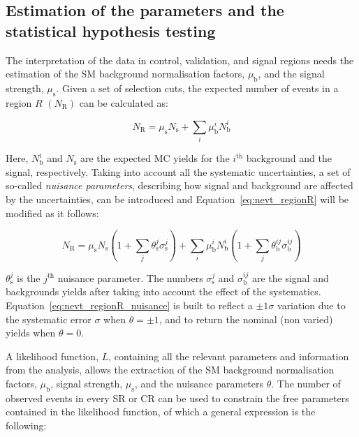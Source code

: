 		\subsection{Estimation of the parameters and the statistical hypothesis testing}

			The interpretation of the data in control, validation, and signal regions needs the estimation of the \ac{SM} background normalisation factors, $\mu_\mathrm{b}$, and the signal strength, $\mu_\mathrm{s}$. Given a set of selection cuts, the expected number of events in a region $R$ $\left ( N_{\mathrm{R}} \right )$ can be calculated as: 

			\begin{equation}
				N_{\mathrm{R}} = \mu_\mathrm{s} N_{\mathrm{s}} + \sum_i \mu_\mathrm{b}^i N_{\mathrm{b}}^i
			\label{eq:nevt_regionR}
			\end{equation}

			\noindent Here, $N_{\mathrm{b}}^i$ and $N_{\mathrm{s}}$ are the expected \ac{MC} yields for the $i^{\mathrm{th}}$ background and the signal, respectively. Taking into account all the systematic uncertainties, a set of so-called \emph{nuisance parameters}, describing how signal and background are affected by the uncertainties, can be introduced and Equation~\ref{eq:nevt_regionR} will be modified as it follows:

			\begin{equation} 
				N_{\mathrm{R}} = \mu_\mathrm{s} N_{\mathrm{s}} \left ( 1 + \sum_j \theta_\mathrm{s}^j \sigma_\mathrm{s}^j \right ) + \sum_i \mu_\mathrm{b}^i N_{\mathrm{b}}^i \left ( 1 + \sum_j \theta_\mathrm{b}^{ij} \sigma_\mathrm{b}^{ij} \right )
			\label{eq:nevt_regionR_nuisance}
			\end{equation} 

			\noindent $\theta_\mathrm{s}^j$ is the $j^{\mathrm{th}}$ nuisance parameter. The numbers $\sigma_\mathrm{s}^j$ and $\sigma_\mathrm{b}^{ij}$ are the signal and backgrounds yields after taking into account the effect of the systematics. Equation~\ref{eq:nevt_regionR_nuisance} is built to reflect a $\pm 1 \sigma$ variation due to the systematic error $\sigma$ when $\theta = \pm 1$, and to return the nominal (non varied) yields when $\theta = 0$. %

			A likelihood function, $L$, containing all the relevant parameters and information from the analysis, allows the extraction of the \ac{SM} background normalisation factors, $\mu_\mathrm{b}$, signal strength, $\mu_\mathrm{s}$, and the nuisance parameters $\theta$. The number of observed events in every \ac{SR} or \ac{CR} can be used to constrain the free parameters contained in the likelihood function, of which a general expression is the following:

